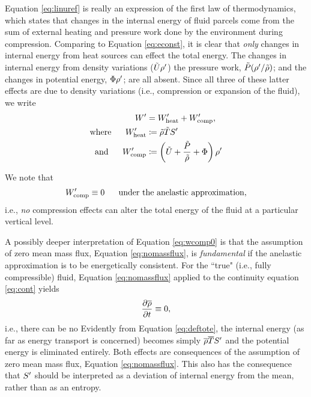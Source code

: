 \documentclass[12pt]{article}
\newcommand{\wpheat}{W^\prime_{\rm heat}}
\newcommand{\wpcomp}{W^\prime_{\rm comp}}
\begin{document}
Equation \eqref{eq:linuref} is really an expression of the first law of thermodynamics, which states that changes in the internal energy of fluid parcels come from the sum of external heating and pressure work done by the environment during compression. Comparing to Equation \eqref{eq:econst}, it is clear that \textit{only} changes in internal energy from heat sources can effect the total energy. The changes in internal energy from density variations ($\tilde{U}\rho^\prime$) the pressure work, $\tilde{P}(\rho^\prime/\tilde{\rho})$; and the changes in potential energy, $\Phi\rho^\prime$; are all absent. Since all three of these latter effects are due to density variations (i.e., compression or expansion of the fluid), we write
\begin{subequations}\label{eq:perten2}
	\begin{align}
		W^\prime &= \wpheat + \wpcomp,\\
		\where \wpheat&\define \rhotilde\tmptilde \entrprime\\
		\andd \wpcomp &\define \left(\intetilde+\frac{\prstilde}{\rhotilde}+\Phi\right)\rhoprime
	\end{align}
\end{subequations}

We note that
\begin{align}\label{eq:wcomp0}
	\wpcomp\equiv0\five\text{under the anelastic approximation},
\end{align}
i.e., \textit{no} compression effects can alter the total energy of the fluid at a particular vertical level.

A possibly deeper interpretation of Equation \eqref{eq:wcomp0} is that the assumption of zero mean mass flux, Equation \eqref{eq:nomassflux}, is \textit{fundamental} if the anelastic approximation is to be energetically consistent. For the ``true" (i.e., fully compressible) fluid, Equation \eqref{eq:nomassflux} applied to the continuity equation \eqref{eq:cont} yields
\begin{align}
	\frac{\partial\overline{\rho}}{\partial t}\equiv0,
\end{align}
i.e., there can be no
Evidently from Equation \eqref{eq:deftote}, the internal energy (as far as energy transport is concerned) becomes simply $\overline{\rho}\overline{T} S^\prime$ and the potential energy is eliminated entirely. Both effects are consequences of the assumption of zero mean mass flux, Equation \eqref{eq:nomassflux}. This also has the consequence that $S^\prime$ should be interpreted as a deviation of internal energy from the mean, rather than as an entropy. 
\end{document}
